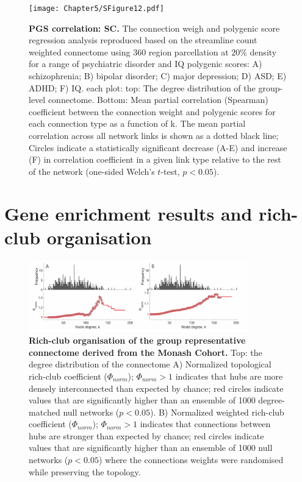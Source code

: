 \begin{figure}[h!]
\begin{center}
\texttt{[image: Chapter5/SFigure12.pdf]}%
\end{center}
\caption{\textbf{PGS correlation: SC.} 
The connection weigh and polygenic score regression analysis reproduced based on the streamline count weighted connectome using 360 region parcellation at $20\%$ density for a range of psychiatric disorder and IQ polygenic scores: A) schizophrenia; B) bipolar disorder; C) major depression; D) ASD; E) ADHD; F) IQ. each plot: top: The degree distribution of the group-level connectome. Bottom: Mean partial correlation (Spearman) coefficient between the connection weight and polygenic scores for each connection type as a function of k. The mean partial correlation across all network links is shown as a dotted black line; Circles indicate a statistically significant decrease (A-E) and increase (F) in correlation coefficient in a given link type relative to the rest of the network (one-sided Welch's $t$-test, $p < 0.05$). }
\label{fig:Ch5SFig12}
\end{figure}

\clearpage
\section{Gene enrichment results and rich-club organisation}
\label{app:AppendixCh5_3}

\begin{figure}[h!]
\begin{center}
\includegraphics[width=0.85\textwidth]{Chapter5/SFigure13.pdf}%
\end{center}
\caption{\textbf{Rich-club organisation of the group representative connectome derived from the Monash Cohort.} Top: the degree distribution of the connectome A) Normalized topological rich-club coefficient ($\Phi_{norm}$); $\Phi_{norm}>1$ indicates that hubs are more densely interconnected than expected by chance; red circles indicate values that are significantly higher than an ensemble of 1000 degree-matched null networks ($p<0.05$). B) Normalized weighted rich-club coefficient ($\Phi_{norm}$); $\Phi_{norm}>1$ indicates that connections between hubs are stronger than expected by chance; red circles indicate values that are significantly higher than an ensemble of 1000 null networks ($p<0.05$) where the connections weights were randomised while preserving the topology. }
\label{fig:Ch5SFig13}
\end{figure}

